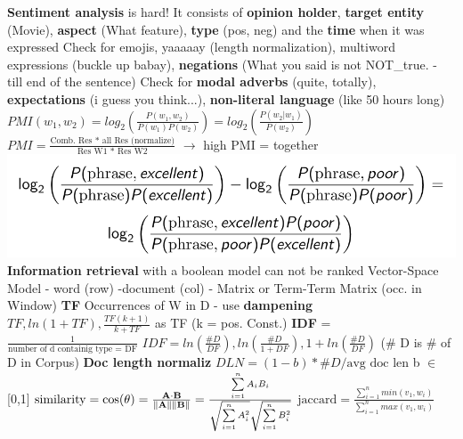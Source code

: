 \documentclass[8pt]{extarticle}
\begin{document}
\begin{multicols*}{3}
\textbf{Sentiment analysis} is hard! It consists of \textbf{opinion holder}, \textbf{target entity} (Movie), \textbf{aspect} (What feature), \textbf{type} (pos, neg) and the \textbf{time} when it was expressed
\newline Check for emojis, yaaaaay (length normalization), multiword expressions (buckle up babay), \textbf{negations} (What you said is not NOT\_true. - till end of the sentence)
\newline Check for \textbf{modal adverbs} (quite, totally), \textbf{expectations} (i guess you think...), \textbf{non-literal language} (like 50 hours long)
\newline $PMI(w_1, w_2) = log_2 (\frac{P(w_1, w_2)}{P(w_1) P(w_2)}) = log_2(\frac{P(w_2 | w_1)}{P(w_2)})$ 
\newline $PMI = \frac{\textrm{Comb. Res * all Res (normalize)}}{\textrm{Res W1 * Res W2}}$ $\rightarrow$ high PMI = together
\includegraphics[width=0.75\columnwidth]{pmi}
\newline \textbf{Information retrieval} with a boolean model can not be ranked
\newline Vector-Space Model - word (row) -document (col) - Matrix or Term-Term Matrix (occ. in Window)
\newline \textbf{TF} Occurrences of W in D - use \textbf{dampening}
\newline $TF, ln(1 + TF), \frac{TF(k+1)}{k+TF}$ as TF (k = pos. Const.)
\newline \textbf{IDF} = $\frac{1}{\textrm{number of d containig type = DF}}$
\newline $IDF = ln(\frac{\# D}{DF}), ln(\frac{\# D}{1 + DF}), 1 + ln(\frac{\# D}{DF})$ (\# D is \# of D in Corpus)
\newline \textbf{Doc length normaliz} $ DLN = (1 - b) * \# D / \textrm{avg doc len} $ b $ \in $  [0,1]
\newline $ \textrm{similarity}=\cos(\theta )={\mathbf {A} \cdot \mathbf {B}  \over \|\mathbf {A} \|\|\mathbf {B} \|}={\frac {\sum \limits _{i=1}^{n}{A_{i}B_{i}}}{{\sqrt {\sum \limits _{i=1}^{n}{A_{i}^{2}}}}{\sqrt {\sum \limits _{i=1}^{n}{B_{i}^{2}}}}}}$
\newline $ {\text{jaccard}}= \frac{\sum \limits _{i=1}^{n} min(v_1, w_i)}{\sum \limits _{i=1}^{n} max(v_1, w_i)}$

\end{multicols*}
\end{document}

